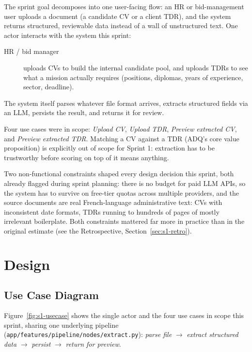 The sprint goal decomposes into one user-facing flow: an HR or bid-management
user uploads a document (a candidate CV or a client TDR), and the system
returns structured, reviewable data instead of a wall of unstructured text.
One actor interacts with the system this sprint:

\begin{description}
  \item[HR / bid manager] uploads CVs to build the internal candidate pool,
    and uploads TDRs to see what a mission actually requires (positions,
    diplomas, years of experience, sector, deadline).
\end{description}

The system itself parses whatever file format arrives, extracts
structured fields via an LLM, persists the result, and returns it for
review.

Four use cases were in scope: \emph{Upload CV}, \emph{Upload TDR},
\emph{Preview extracted CV}, and \emph{Preview extracted TDR}. Matching a
CV against a TDR (ADQ's core value proposition) is explicitly out of
scope for Sprint 1: extraction has to be trustworthy before scoring on
top of it means anything.

Two non-functional constraints shaped every design decision this sprint,
both already flagged during sprint planning: there is no budget for paid
LLM APIs, so the system has to survive on free-tier quotas across multiple
providers, and the source documents are real French-language administrative
text: CVs with inconsistent date formats, TDRs running to hundreds of
pages of mostly irrelevant boilerplate. Both constraints mattered far more
in practice than in the original estimate (see the Retrospective,
Section~\ref{sec:s1-retro}).

\section{Design}

\subsection{Use Case Diagram}

Figure~\ref{fig:s1-usecase} shows the single actor and the four use cases
in scope this sprint, sharing one underlying pipeline
(\texttt{app/features/pipeline/nodes/extract.py}): \emph{parse file}
$\to$ \emph{extract structured data} $\to$ \emph{persist} $\to$
\emph{return for preview}.

